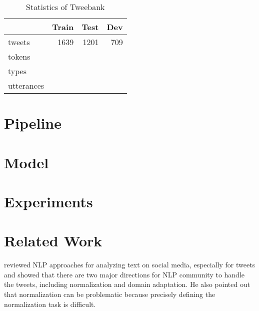 \documentclass[11pt,letterpaper]{article}
\begin{document}
\begin{table}[h!]
\centering
 \begin{tabular}{l r r r} 
 \hline
 			& 	Train 		& 	Test		&	Dev\\[0.5ex] \hline
tweets 		&	1639 		&	1201		&	709\\
tokens 		&			&			&	\\
types 		&	 		&			&	\\
utterances 	&	 		&			&	\\ \hline
\end{tabular}
 \caption{Statistics of Tweebank}
 \label{tab1}
\end{table}





\section{Pipeline}

\section{Model}

\section{Experiments}


\section{Related Work}
 reviewed NLP approaches for analyzing text on social media, especially for tweets and showed that there are two major directions for NLP community to handle the tweets, including normalization and domain adaptation. He also pointed out that normalization can be problematic because precisely defining the normalization task is difficult. 
\end{document}
